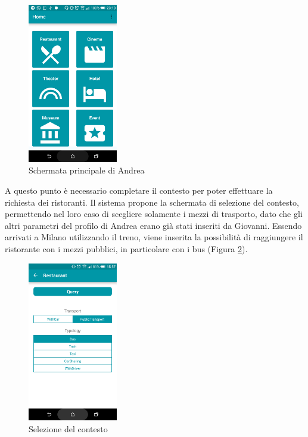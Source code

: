 \begin{figure}[H]
	\centering
	\includegraphics[width=0.35\textwidth]{4-progettazione-alto-livello/Immagini/home_caso_d'uso.png}
	\caption{Schermata principale di Andrea}\label{fig:usecase-home}
\end{figure}

A questo punto è necessario completare il contesto per poter effettuare la richiesta dei ristoranti. Il sistema propone la schermata di selezione del contesto, permettendo nel loro caso di scegliere solamente i mezzi di trasporto, dato che gli altri parametri del profilo di Andrea erano già stati inseriti da Giovanni. Essendo arrivati a Milano utilizzando il treno, viene inserita la possibilità di raggiungere il ristorante con i mezzi pubblici, in particolare con i bus (Figura \ref{fig:usecase-contesto}). 

\begin{figure}[H]
	\centering
	\includegraphics[width=0.35\textwidth]{4-progettazione-alto-livello/Immagini/contesto_caso_d'uso.png}
	\caption{Selezione del contesto}\label{fig:usecase-contesto}
\end{figure}

